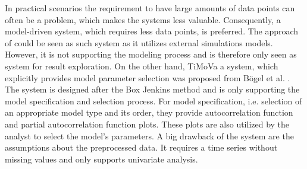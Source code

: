 \documentclass[electronic]{vgtc}             %
\begin{document}
In practical scenarios the requirement to have large amounts of data points can often be a problem, which makes the systems \cite{Hochheiser:2004, buono:2005, buono:2007} less valuable.
Consequently, a model-driven system, which requires less data points, is preferred.
The approach of \cite{ichikawa:2002} could be seen as such system as it utilizes external simulations models.
However, it is not supporting the modeling process and is therefore only seen as system for result exploration.
On the other hand, TiMoVa a system, which explicitly provides model parameter selection was proposed from B{\"o}gel et al. \cite{boegl:2013}.
The system is designed after the Box Jenkins method and is only supporting the model specification and selection process.
For model specification, i.e. selection of an appropriate model type and its order, they provide autocorrelation function and partial autocorrelation function plots.
These plots are also utilized by the analyst to select the model's parameters.
A big drawback of the system are the assumptions about the preprocessed data. 
It requires a time series without missing values and only supports univariate analysis.
\end{document}
